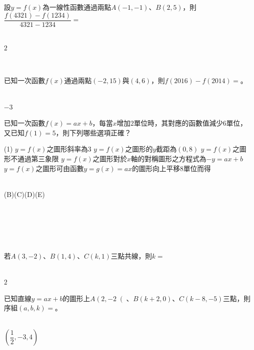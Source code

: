 \documentclass
[answers]
{exam}
\newcommand\ul[1]{\uline{\hspace*{#1}}}
\theoremstyle{definition}
\begin{document}
\begin{questions}
\question

設$y = f(x)$為一線性函數通過兩點$A\left( -1,-1\right)$、$B\left( 2,5\right)$，則$\dfrac{f(4321)-f(1234)}{4321-1234} = $\ul{50pt}
\\ 
\begin{solution}~\\
	$2$
\end{solution}

$ $\\
\question

已知一次函數$f(x)$通過兩點$\left( -2,15\right)$與$\left( 4,6\right)$，則$f(2016)-f(2014)=$\ul{50pt}。
\\ 
\begin{solution}~\\
	$-3$
\end{solution}

\question

已知一次函數$f(x)=ax+b$，每當$x$增加$2$單位時，其對應的函數值減少$6$單位，又已知$f(1)=5$，則下列哪些選項正確？

\begin{tasks}(1)
	\task $y=f(x)$之圖形斜率為$3$
	\task $y=f(x)$之圖形的$y$截距為$\left( 0,8\right)$
	\task $y=f(x)$之圖形不通過第三象限
	\task $y=f(x)$之圖形對於$x$軸的對稱圖形之方程式為$-y=ax+b$
	\task $y=f(x)$之圖形可由函數$y=g(x)=ax$的圖形向上平移$8$單位而得
\end{tasks}
\begin{solution}~\\
	(B)(C)(D)(E)
\end{solution}
$ $\\$ $\\$ $\\$ $\\
\question

若$A\left( 3,-2\right)$、$B\left( 1,4\right)$、$C\left( k,1\right)$三點共線，則$k=$\ul{50pt}
\\ 
\begin{solution}~\\
	$2$
\end{solution}

\question

已知直線$y=ax+b$的圖形上$A\left( 2,-2\right($、$B\left(k+2,0\right)$、$C\left(k-8,-5\right)$三點，則序組$\left( a,b,k \right) =$\ul{50pt}。
\\ 
\begin{solution}~\\
	$\left(  \dfrac{1}{2},-3,4  \right)$
\end{solution}


\end{questions}
\end{document}
